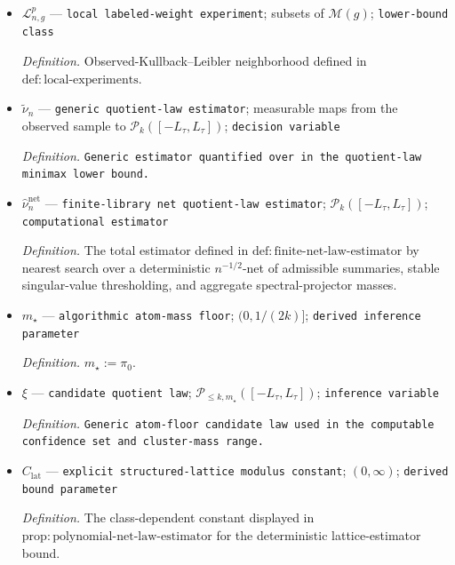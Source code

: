 \documentclass{article}
\begin{document}
\begin{itemize}
  \par\smallskip\noindent\emph{Definition.} The ordered atom-mass vector of \(\widehat\nu_n\) when that law has exactly \(k\) support points, and the simplex barycenter otherwise, as defined in \(\mathrm{def:labeled\text{-}weight\text{-}estimator}\).
  \item \(\mathcal L_{n,g}^{p}\) --- \texttt{local labeled-\allowbreak{}weight experiment}; subsets of \(\mathcal M(g)\); \texttt{lower-\allowbreak{}bound class}
  \par\smallskip\noindent\emph{Definition.} Observed-Kullback--Leibler neighborhood defined in \(\mathrm{def:local\text{-}experiments}\).
  \item \(\widetilde\nu_n\) --- \texttt{generic quotient-\allowbreak{}law estimator}; measurable maps from the observed sample to \(\mathcal P_k([-L_{\tau},L_{\tau}])\); \texttt{decision variable}
  \par\smallskip\noindent\emph{Definition.} \texttt{Generic estimator quantified over in the quotient-\allowbreak{}law minimax lower bound.}
  \item \(\widehat\nu_n^{\mathrm{net}}\) --- \texttt{finite-\allowbreak{}library net quotient-\allowbreak{}law estimator}; \(\mathcal P_k([-L_{\tau},L_{\tau}])\); \texttt{computational estimator}
  \par\smallskip\noindent\emph{Definition.} The total estimator defined in \(\mathrm{def:finite\text{-}net\text{-}law\text{-}estimator}\) by nearest search over a deterministic \(n^{-1/2}\)-net of admissible summaries, stable singular-value thresholding, and aggregate spectral-projector masses.
  \item \(m_\star\) --- \texttt{algorithmic atom-\allowbreak{}mass floor}; \((0,1/(2k)]\); \texttt{derived inference parameter}
  \par\smallskip\noindent\emph{Definition.} \(m_\star:=\pi_0\).
  \item \(\xi\) --- \texttt{candidate quotient law}; \(\mathcal P_{\le k,m_\star}([-L_{\tau},L_{\tau}])\); \texttt{inference variable}
  \par\smallskip\noindent\emph{Definition.} \texttt{Generic atom-\allowbreak{}floor candidate law used in the computable confidence set and cluster-\allowbreak{}mass range.}
  \item \(C_{\mathrm{lat}}\) --- \texttt{explicit structured-\allowbreak{}lattice modulus constant}; \((0,\infty)\); \texttt{derived bound parameter}
  \par\smallskip\noindent\emph{Definition.} The class-dependent constant displayed in \(\mathrm{prop:polynomial\text{-}net\text{-}law\text{-}estimator}\) for the deterministic lattice-estimator bound.

\end{itemize}
\end{document}
